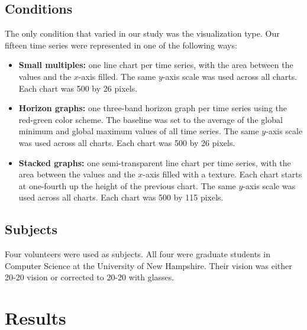 \documentclass{article}
\begin{document}
\subsection{Conditions}

The only condition that varied in our study was the visualization type.  Our fifteen time series were represented in one of the following ways:

\begin{itemize}
\item \textbf{Small multiples:} one line chart per time series, with the area between the values and the $x$-axis filled. The same $y$-axis scale was used across all charts.  Each chart was 500 by 26 pixels.
\item \textbf{Horizon graphs:} one three-band horizon graph per time series using the red-green color scheme.  The baseline was set to the average of the global minimum and global maximum values of all time series.  The same $y$-axis scale was used across all charts.  Each chart was 500 by 26 pixels.
\item \textbf{Stacked graphs:}  one semi-transparent line chart per time series, with the area between the values and the $x$-axis filled with a texture. Each chart starts at one-fourth up the height of the previous chart. The same $y$-axis scale was used across all charts.  Each chart was 500 by 115 pixels.
\end{itemize}

\subsection{Subjects}

Four volunteers were used as subjects.  All four were graduate students in Computer Science at the University of New Hampshire.  Their vision was either 20-20 vision or corrected to 20-20 with glasses.

\section{Results}
\end{document}
